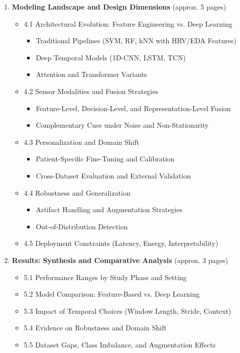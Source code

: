 \begin{enumerate}
  \item \textbf{Modeling Landscape and Design Dimensions} (approx. 5 pages)
    \begin{itemize}
      \item 4.1 Architectural Evolution: Feature Engineering vs. Deep Learning
        \begin{itemize}
          \item Traditional Pipelines (SVM, RF, kNN with HRV/EDA Features)
          \item Deep Temporal Models (1D-CNN, LSTM, TCN)
          \item Attention and Transformer Variants
        \end{itemize}
      \item 4.2 Sensor Modalities and Fusion Strategies
        \begin{itemize}
          \item Feature-Level, Decision-Level, and Representation-Level Fusion
          \item Complementary Cues under Noise and Non-Stationarity
        \end{itemize}
      \item 4.3 Personalization and Domain Shift
        \begin{itemize}
          \item Patient-Specific Fine-Tuning and Calibration
          \item Cross-Dataset Evaluation and External Validation
        \end{itemize}
      \item 4.4 Robustness and Generalization
        \begin{itemize}
          \item Artifact Handling and Augmentation Strategies
          \item Out-of-Distribution Detection
        \end{itemize}
      \item 4.5 Deployment Constraints (Latency, Energy, Interpretability)
    \end{itemize}
    
  \item \textbf{Results: Synthesis and Comparative Analysis} (approx. 3 pages)
    \begin{itemize}
      \item 5.1 Performance Ranges by Study Phase and Setting
      \item 5.2 Model Comparison: Feature-Based vs. Deep Learning
      \item 5.3 Impact of Temporal Choices (Window Length, Stride, Context)
      \item 5.4 Evidence on Robustness and Domain Shift
      \item 5.5 Dataset Gaps, Class Imbalance, and Augmentation Effects
    \end{itemize}
    

\end{enumerate}
